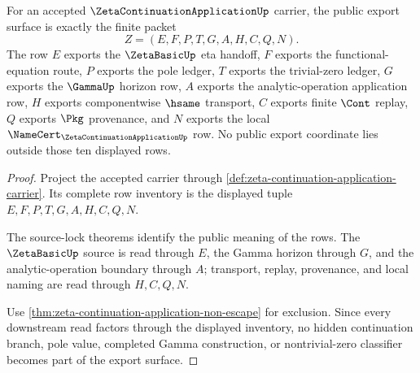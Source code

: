 \begin{theorem}
\label{thm:zeta-continuation-application-public-export-surface}
For an accepted $\ZetaContinuationApplicationUp$ carrier, the public export surface is exactly the finite packet
$$
Z=(E,F,P,T,G,A,H,C,Q,N).
$$
The row $E$ exports the $\ZetaBasicUp$ eta handoff, $F$ exports the functional-equation route, $P$ exports the pole ledger, $T$ exports the trivial-zero ledger, $G$ exports the $\GammaUp$ horizon row, $A$ exports the analytic-operation application row, $H$ exports componentwise $\hsame$ transport, $C$ exports finite $\Cont$ replay, $Q$ exports $\Pkg$ provenance, and $N$ exports the local $\NameCert_{\ZetaContinuationApplicationUp}$ row. No public export coordinate lies outside those ten displayed rows.
\end{theorem}
\begin{proof}
Project the accepted carrier through \autoref{def:zeta-continuation-application-carrier}. Its complete row inventory is the displayed tuple $E,F,P,T,G,A,H,C,Q,N$.

The source-lock theorems identify the public meaning of the rows. The $\ZetaBasicUp$ source is read through $E$, the Gamma horizon through $G$, and the analytic-operation boundary through $A$; transport, replay, provenance, and local naming are read through $H,C,Q,N$.

Use \autoref{thm:zeta-continuation-application-non-escape} for exclusion. Since every downstream read factors through the displayed inventory, no hidden continuation branch, pole value, completed Gamma construction, or nontrivial-zero classifier becomes part of the export surface.
\end{proof}

